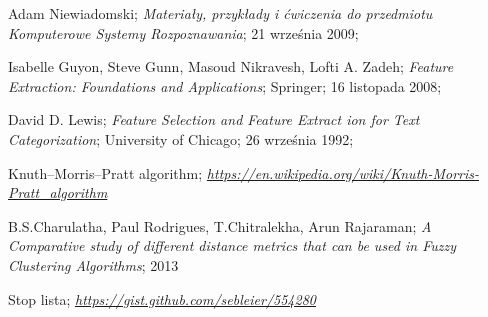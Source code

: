 \documentclass{classrep}
\begin{document}
\begin{thebibliography}{0}

 Adam Niewiadomski;
\textsl{Materiały, przykłady i ćwiczenia do przedmiotu
Komputerowe Systemy Rozpoznawania}; 21 września 2009;

 Isabelle Guyon, Steve Gunn, Masoud Nikravesh, Lofti A. Zadeh;
\textsl{Feature Extraction: Foundations and Applications}; Springer; 16 listopada 2008;

 David D. Lewis;
\textsl{Feature Selection and Feature Extract ion for Text Categorization}; University of Chicago; 26 września 1992;

 Knuth–Morris–Pratt algorithm;
\textsl{\url{https://en.wikipedia.org/wiki/Knuth-Morris-Pratt_algorithm}}

 B.S.Charulatha, Paul Rodrigues, T.Chitralekha, Arun Rajaraman;
\textsl{A Comparative study of different distance metrics that can be used in Fuzzy Clustering Algorithms}; 2013

 Stop lista;
\textsl{\url{https://gist.github.com/sebleier/554280}}

\end{thebibliography}
\end{document}
